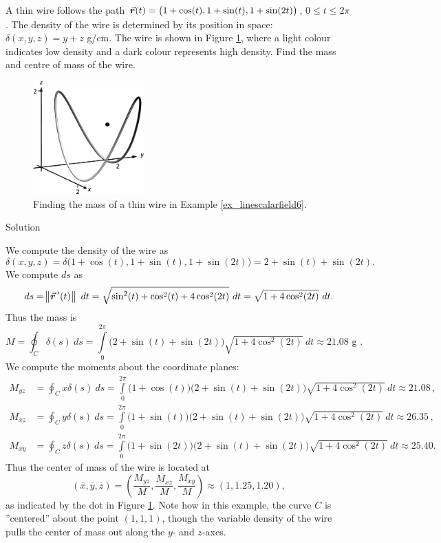 \begin{example}\label{ex_linescalarfield6}
A thin wire follows the path $\vrt = \left( 1+\cos(t),1+\sin(t), 1+ \sin(2t)\right)$, $0\leq t\leq 2\pi$. The density of the wire is determined by its position in space: $\delta(x,y,z) = y+z$ g/cm. The wire is shown in Figure \ref{fig_double_24}, where a light colour indicates low density and a dark colour represents high density. Find the mass  and centre of mass of the wire.


\begin{figure}[H]
	\begin{center}
			\includegraphics[width=0.38\textwidth]{fig_double_24}
	\caption{Finding the mass of a thin wire in Example \ref{ex_linescalarfield6}.}
	\label{fig_double_24}
	\end{center}
\end{figure}
\vspace*{-0.5cm}
Solution 

We compute the density of the wire as 
$$\delta(x,y,z) = \delta\big(1+\cos(t),1+\sin(t), 1+\sin(2t)\big) = 2+\sin(t)+\sin(2t).$$ We compute $ds$ as
$$ds = \norm{\vrp(t)}\ dt = \sqrt{\sin^2(t)+\cos^2(t)+4\cos^2(2t)}\ dt = \sqrt{1+4\cos^2(2t)}\ dt.$$
Thus the mass is
$$M = \oint_C \delta(s)\ ds = \int\limits_0^{2\pi} \big(2+\sin(t)+\sin(2t)\big)\sqrt{1+4\cos^2(2t)}\ dt \approx 21.08 \text{ g }. $$
We compute the moments about the coordinate planes:%
\begin{align*}
M_{yz} &= \oint_C x\delta(s)\ ds = \int\limits_0^{2\pi}\big(1+\cos(t)\big)\big(2+\sin(t)+\sin(2t)\big)\sqrt{1+4\cos^2(2t)}\ dt \approx 21.08\, , \\
M_{xz} &= \oint_C y\delta(s)\ ds = \int\limits_0^{2\pi}\big(1+\sin(t)\big)\big(2+\sin(t)+\sin(2t)\big)\sqrt{1+4\cos^2(2t)}\ dt \approx
26.35\, ,\\
M_{xy} &= \oint_C z\delta(s)\ ds = \int\limits_0^{2\pi}\big(1+\sin(2 t)\big)\big(2+\sin(t)+\sin(2t)\big)\sqrt{1+4\cos^2(2t)}\ dt \approx 25.40.
\end{align*}%
Thus the center of mass of the wire is located at 
$$(\overline{x},\overline{y},\overline{z}) = \left(\frac{M_{yz}}M, \frac{M_{xz}}M,\frac{M_{xy}}M\right) \approx (1,1.25,1.20),$$
as indicated by the dot in Figure \ref{fig_double_24}. Note how in this example, the curve $C$ is ''centered'' about the point $(1,1,1)$, though the variable density of the wire pulls the center of mass out along the $y$- and $z$-axes.
\end{example}


